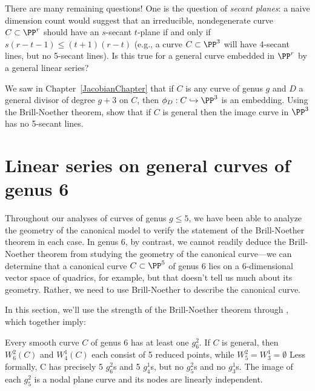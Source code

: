 There are many remaining questions! One is the question of \emph{secant planes}: a naive dimension count would suggest that an irreducible, nondegenerate curve $C \subset \PP^r$ should have an $s$-secant $t$-plane if and only if $s(r-t-1) \leq (t+1)(r-t)$
(e.g., a curve $C \subset \PP^3$ will have 4-secant lines, but no 5-secant lines). Is this true for a general curve embedded in $\PP^r$ by a general linear series?

\begin{exercise}
We saw in Chapter~\ref{JacobianChapter} that if $C$ is any curve of genus $g$ and $D$ a general divisor of degree $g+3$ on $C$, then $\phi_D : C \hookrightarrow \PP^3$ is an embedding. Using the Brill-Noether theorem, show that if $C$ is general then the image curve in $\PP^3$ has no 5-secant lines.
\end{exercise}

\section{Linear series on general curves of genus 6}\label{genus 6 section}\label{general genus 6}


Throughout our analyses of curves of genus $g \leq 5$, we have been able to analyze the geometry of the canonical model to verify the statement of the Brill-Noether theorem in each case. In genus 6, by contrast, we cannot readily deduce the Brill-Noether theorem from studying the geometry of the canonical curve---we can determine that a canonical curve $C \subset \PP^5$ of genus 6 lies on a 6-dimensional vector space of quadrics, for example, but that doesn't tell us much about its geometry. Rather, we need to use Brill-Noether to describe the canonical curve. 

In this section, we'll use the  strength of the Brill-Noether theorem through , which together imply:

\begin{theorem}\label{BN consequences}
Every smooth curve $C$ of genus 6 has at least one $g^{2}_{6}$. If $C$ is general, then
$W^{2}_{6}(C)$ and $W^{1}_{4}(C)$ each consist of 5 reduced points, while $W^{2}_{5} = W^{1}_{3} = \emptyset$  Less formally, C has precisely 5 $g^{2}_{6}$s and 5 $g^{1}_{4}$s, but no $g^{2}_{5}$s and no $g^{1}_{3}$s. The image of each $g^{2}_{5}$ is a nodal plane curve and its nodes are linearly independent.
\end{theorem}

